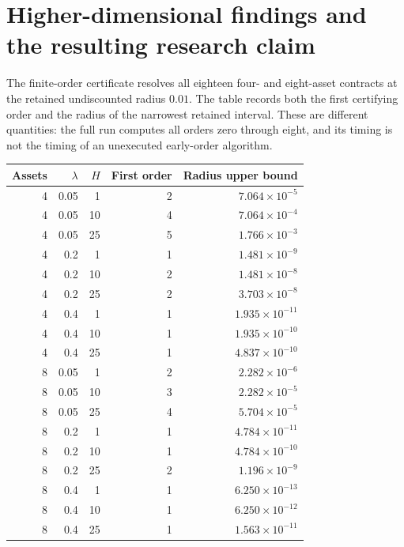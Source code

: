 \section{Higher-dimensional findings and the resulting research claim}
\label{sec:higherdim-findings}

The finite-order certificate resolves all eighteen four- and eight-asset
contracts at the retained undiscounted radius $0.01$. The table records both
the first certifying order and the radius of the narrowest retained interval.
These are different quantities: the full run computes all orders zero through
eight, and its timing is not the timing of an unexecuted early-order algorithm.

\begin{center}
\begin{tabular}{rrrrr}
\toprule
Assets & $\lambda$ & $H$ & First order & Radius upper bound\\
\midrule
4 & 0.05 & 1 & 2 & $7.064\times10^{-5}$\\
4 & 0.05 & 10 & 4 & $7.064\times10^{-4}$\\
4 & 0.05 & 25 & 5 & $1.766\times10^{-3}$\\
4 & 0.2 & 1 & 1 & $1.481\times10^{-9}$\\
4 & 0.2 & 10 & 2 & $1.481\times10^{-8}$\\
4 & 0.2 & 25 & 2 & $3.703\times10^{-8}$\\
4 & 0.4 & 1 & 1 & $1.935\times10^{-11}$\\
4 & 0.4 & 10 & 1 & $1.935\times10^{-10}$\\
4 & 0.4 & 25 & 1 & $4.837\times10^{-10}$\\
8 & 0.05 & 1 & 2 & $2.282\times10^{-6}$\\
8 & 0.05 & 10 & 3 & $2.282\times10^{-5}$\\
8 & 0.05 & 25 & 4 & $5.704\times10^{-5}$\\
8 & 0.2 & 1 & 1 & $4.784\times10^{-11}$\\
8 & 0.2 & 10 & 1 & $4.784\times10^{-10}$\\
8 & 0.2 & 25 & 2 & $1.196\times10^{-9}$\\
8 & 0.4 & 1 & 1 & $6.250\times10^{-13}$\\
8 & 0.4 & 10 & 1 & $6.250\times10^{-12}$\\
8 & 0.4 & 25 & 1 & $1.563\times10^{-11}$\\
\bottomrule
\end{tabular}
\end{center}

